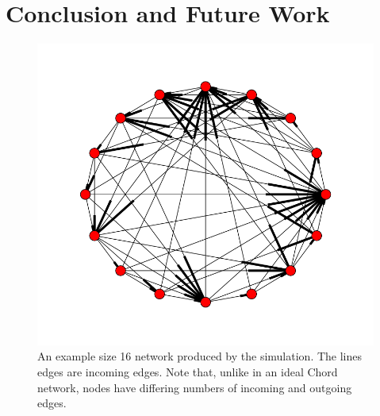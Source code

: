 \documentclass[12pt]{article} %
\begin{document}
\section{Conclusion and Future Work}



\begin{figure}
\includegraphics[width=\linewidth]{chordreal}
\caption{An example size 16 network produced by the simulation.  The lines edges are incoming edges.  Note that, unlike in an ideal Chord network, nodes have differing numbers of incoming and outgoing edges.}
\label{chordreal}
\end{figure}








\end{document}
